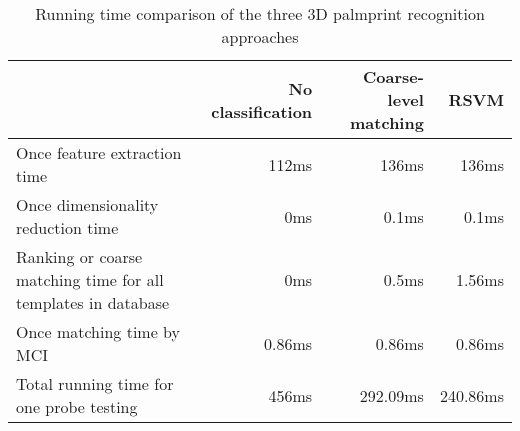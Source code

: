 \begin{table}[htbp]
  \centering
  \caption{Running time comparison of the three 3D palmprint recognition approaches}
    \begin{tabular}{|p{4.5cm}|r|r|r|}
    \hline
          & No classification & Coarse-level matching & RSVM \\
    \hline
    {Once feature extraction time} & 112ms & 136ms & 136ms \\ \hline
    {Once dimensionality reduction time} & 0ms   & 0.1ms & 0.1ms \\ \hline
    {Ranking or coarse matching time for all templates in database} & 0ms   & 0.5ms & 1.56ms \\ \hline
    {Once matching time by MCI} & 0.86ms & 0.86ms & 0.86ms \\ \hline
    {Total running time for one probe testing} & 456ms & 292.09ms & 240.86ms \\
    \hline
    \end{tabular}%
  \label{tab:experiment:time}%
\end{table}%

